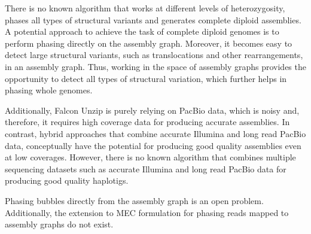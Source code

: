 
There is no known algorithm that works at different levels of heterozygosity, phases all types of structural variants and generates complete diploid assemblies.
A potential approach to achieve the task of complete diploid genomes is to perform phasing directly on the assembly graph.
Moreover, it becomes easy to detect large structural variants, such as translocations and other rearrangements, in an assembly graph.
Thus, working in the space of assembly graphs provides the opportunity to detect all types of structural variation, which further helps in phasing whole genomes.

Additionally, Falcon Unzip is purely relying on PacBio data, which is noisy and, therefore, it requires high coverage data for producing accurate assemblies.
In contrast, hybrid approaches that combine accurate Illumina and long read PacBio data, conceptually have the potential for producing good quality assemblies even at low coverages.
However, there is no known algorithm that combines multiple sequencing datasets such as accurate Illumina and long read PacBio data for producing good quality haplotigs.
\begin{gaps}
 Phasing bubbles directly from the assembly graph is an open problem. Additionally, the extension to MEC formulation for phasing reads mapped to assembly graphs do not exist. 
 \label{gap:gap4}
\end{gaps}


